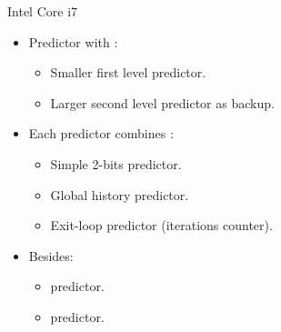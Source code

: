 \begin{frame}[t]{Intel Core i7}
\begin{itemize}
  \item Predictor with :
    \begin{itemize}
      \item Smaller first level predictor.
      \item Larger second level predictor as backup.
    \end{itemize}

  \item Each predictor combines :
    \begin{itemize}
      \item Simple 2-bits predictor.
      \item Global history predictor.
      \item Exit-loop predictor (iterations counter).
    \end{itemize}

  \item Besides:
    \begin{itemize}
      \item {} predictor.
      \item {} predictor.
    \end{itemize}
\end{itemize}
\end{frame}
